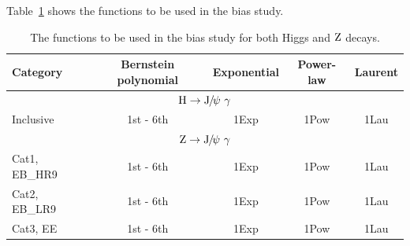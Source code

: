 		Table~\ref{tab:truthFuncs} shows the functions to be used in the bias study.
		\begin{table}[!ht]
		  \centering
		  \begin{tabular}{|l|c|c|c|c|}
		    \hline
		    Category & Bernstein polynomial & Exponential & Power-law  & Laurent \\
		    \hline
		    \multicolumn{5}{|c|}{$\mathrm{H}\to{\mathrm{J}\hspace{-.08em}/\hspace{-.14em}\psi}\ \gamma$} \\
		    \hline
		    Inclusive & 1st - 6th & 1Exp & 1Pow & 1Lau\\
		    \hline
		    \multicolumn{5}{|c|}{$\mathrm{Z}\to{\mathrm{J}\hspace{-.08em}/\hspace{-.14em}\psi}\ \gamma$} \\
		    \hline
		    Cat1, EB\_HR9 & 1st - 6th & 1Exp & 1Pow & 1Lau\\
		    Cat2, EB\_LR9 & 1st - 6th & 1Exp & 1Pow & 1Lau\\
		    Cat3, EE & 1st - 6th & 1Exp & 1Pow & 1Lau\\
		    \hline
		  \end{tabular}
		  \caption{The functions to be used in the bias study for both Higgs and $\mathrm{Z}$ decays.\label{tab:truthFuncs}}
		\end{table}
		
